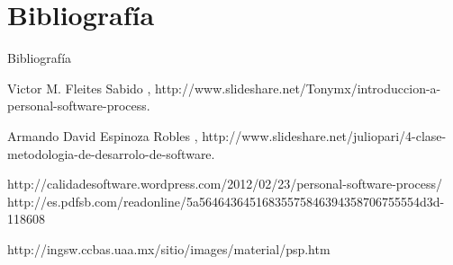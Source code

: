 \documentclass{beamer}
\begin{document}
			\section{Bibliograf\'ia}
				\begin{frame}{Bibliograf\'ia}
					\begin{thebibliography}{9}
		
 						Victor M. Fleites Sabido 
 						, 
 						\newblock http://www.slideshare.net/Tonymx/introduccion-a-personal-software-process.
		
 						Armando David Espinoza Robles
 						, 
 						\newblock http://www.slideshare.net/juliopari/4-clase-metodologia-de-desarrolo-de-software.
 			
						http://calidadesoftware.wordpress.com/2012/02/23/personal-software-process/ 			
						http://es.pdfsb.com/readonline/5a56464364516835575846394358706755554d3d-118608
 			
 						http://ingsw.ccbas.uaa.mx/sitio/images/material/psp.htm
					\end{thebibliography}
				\end{frame}

		
\end{document}
